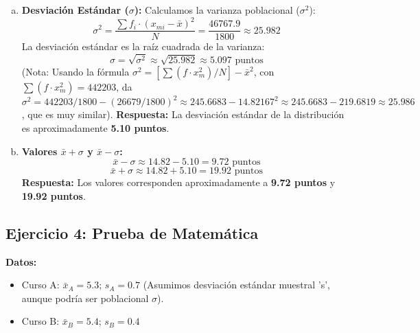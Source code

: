 \documentclass[10pt, a4paper]{article}
\newcommand{\mean}[1]{\ensuremath{\bar{#1}}} %
\newcommand{\stdev}{\ensuremath{s}} %
\newcommand{\pstdev}{\ensuremath{\sigma}} %
\newcommand{\pvar}{\ensuremath{\sigma^2}} %
\begin{document}
\begin{enumerate}[a.]
    \item \textbf{Desviación Estándar (\pstdev):}
    Calculamos la varianza poblacional (\pvar):
    \[ \pvar = \frac{\sum f_i \cdot (x_{mi} - \mean{x})^2}{N} = \frac{\num{46767,9}}{\num{1800}} \approx \num{25,982} \]
    La desviación estándar es la raíz cuadrada de la varianza:
    \[ \pstdev = \sqrt{\pvar} \approx \sqrt{\num{25,982}} \approx \num{5,097} \text{ puntos} \]
    (Nota: Usando la fórmula $\pvar = [\sum(f \cdot x_m^2) / N] - \mean{x}^2$, con $\sum(f \cdot x_m^2) = \num{442203}$, da $\pvar = \num{442203}/1800 - (\num{26679}/1800)^2 \approx \num{245,6683} - \num{14,82167}^2 \approx \num{245,6683} - \num{219,6819} \approx \num{25,986}$, que es muy similar).
    \textbf{Respuesta:} La desviación estándar de la distribución es aproximadamente \textbf{\num{5,10} puntos}.

    \item \textbf{Valores $\mean{x} + \pstdev$ y $\mean{x} - \pstdev$:}
    \[ \mean{x} - \pstdev \approx \num{14,82} - \num{5,10} = \num{9,72} \text{ puntos} \]
    \[ \mean{x} + \pstdev \approx \num{14,82} + \num{5,10} = \num{19,92} \text{ puntos} \]
    \textbf{Respuesta:} Los valores corresponden aproximadamente a \textbf{\num{9,72} puntos} y \textbf{\num{19,92} puntos}.
\end{enumerate}


\subsection*{Ejercicio 4: Prueba de Matemática}
\textbf{Datos:}
\begin{itemize}[nosep]
    \item Curso A: $\mean{x}_A = \num{5,3}$; $\stdev_A = \num{0,7}$ (Asumimos desviación estándar muestral 's', aunque podría ser poblacional $\pstdev$).
    \item Curso B: $\mean{x}_B = \num{5,4}$; $\stdev_B = \num{0,4}$
\end{itemize}
\end{document}
